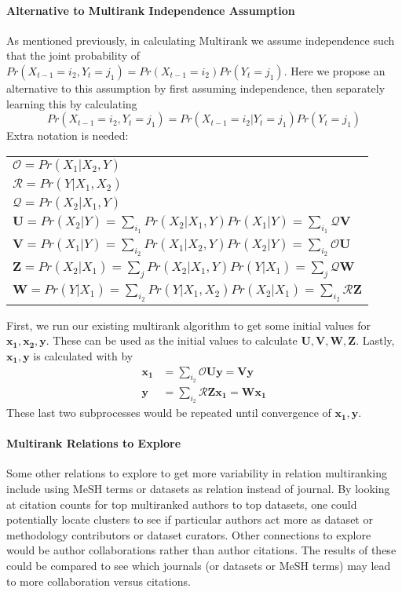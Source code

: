 \paragraph{Alternative to Multirank Independence Assumption}
\label{para:alternative}
As mentioned previously, in calculating Multirank we assume independence such that the joint probability of $Pr(X_{t-1}=i_2,Y_t=j_1) = Pr(X_{t-1}=i_2)Pr(Y_t=j_1)$. Here we propose an alternative to this assumption by first assuming independence, then separately learning this by calculating $$Pr(X_{t-1}=i_2,Y_t=j_1) = Pr(X_{t-1}=i_2|Y_t=j_1)Pr(Y_t=j_1)$$ Extra notation is needed:
\begin{table}[h]
\begin{tabular}{l}
$\mathcal{O} = Pr(X_1|X_2,Y)$ \\
$\mathcal{R}=Pr(Y|X_1,X_2)$ \\
$\mathcal{Q}=Pr(X_2|X_1,Y)$ \\
$\mathbf{U} = Pr(X_2|Y) = \sum_{i_1} Pr(X_2|X_1,Y) Pr(X_1|Y) = \sum_{i_1} \mathcal{Q}\mathbf{V}$ \\
$\mathbf{V} = Pr(X_1|Y) = \sum_{i_2} Pr(X_1|X_2,Y) Pr(X_2|Y) =\sum_{i_2} \mathcal{O}\mathbf{U}$ \\
$\mathbf{Z} = Pr(X_2|X_1) = \sum_j Pr(X_2|X_1,Y) Pr(Y|X_1) =\sum_j \mathcal{Q}\mathbf{W}$ \\
$\mathbf{W} = Pr(Y|X_1) = \sum_{i_2} Pr(Y|X_1,X_2) Pr(X_2|X_1) =\sum_{i_2} \mathcal{R}\mathbf{Z}$
\end{tabular}
\end{table}

First, we run our existing multirank algorithm to get some initial values for $\mathbf{x_1,x_2,y}$. These can be used as the initial values to calculate $\mathbf{U,V,W,Z}$. Lastly, $\mathbf{x_1,y}$ is calculated with by
\begin{align*}
    \mathbf{x_1} &= \sum_{i_2}\mathcal{O}\mathbf{Uy} = \mathbf{Vy} \\
    \mathbf{y} &= \sum_{i_2}\mathcal{R}\mathbf{Zx_1} = \mathbf{Wx_1}
\end{align*}
These last two subprocesses would be repeated until convergence of $\mathbf{x_1,y}$.

\paragraph{Multirank Relations to Explore}
Some other relations to explore to get more variability in relation multiranking include using MeSH terms or datasets as relation instead of journal. By looking at citation counts for top multiranked authors to top datasets, one could potentially locate clusters to see if particular authors act more as dataset or methodology contributors or dataset curators. Other connections to explore would be author collaborations rather than author citations. The results of these could be compared to see which journals (or datasets or MeSH terms) may lead to more collaboration versus citations.

